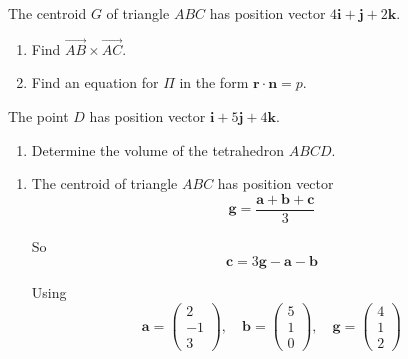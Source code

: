 \documentclass[leqno]{article}
\begin{document}
\begin{enumerate}[
  label=\textbf{\arabic*.},
  leftmargin=*,
  topsep=0pt,
  partopsep=0pt,
  parsep=0pt
]
The centroid $G$ of triangle $ABC$ has position vector $4\mathbf{i}+\mathbf{j}+2\mathbf{k}$. \\

\begin{enumerate}[label=\textbf{(\alph*)}]
  \item Find $\overrightarrow{AB} \times \overrightarrow{AC}$.  \\
  \item Find an equation for $\Pi$ in the form $\mathbf{r} \cdot \mathbf{n} = p$.  \\
\end{enumerate}
The point $D$ has position vector $\mathbf{i}+5\mathbf{j}+4\mathbf{k}$. \\
\begin{enumerate}[label=\textbf{(\alph*)}, resume]
  \item Determine the volume of the tetrahedron $ABCD$.  \\
\end{enumerate}

\vspace*{10pt}

\begin{djsSolution}
\begin{enumerate}[label=\textbf{(\alph*)}]
  \item The centroid of triangle \(ABC\) has position vector
\[
\mathbf{g}=\frac{\mathbf{a}+\mathbf{b}+\mathbf{c}}{3}
\]

So
\[
\mathbf{c}=3\mathbf{g}-\mathbf{a}-\mathbf{b}
\]

Using
\[
\mathbf{a}=\begin{pmatrix}2\\-1\\3\end{pmatrix},
\quad
\mathbf{b}=\begin{pmatrix}5\\1\\0\end{pmatrix},
\quad
\mathbf{g}=\begin{pmatrix}4\\1\\2\end{pmatrix}
\]


\end{enumerate}
\end{djsSolution}
\end{enumerate}
\end{document}
